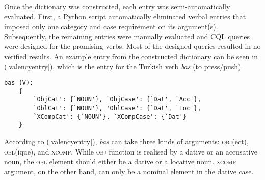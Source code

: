 Once the dictionary was constructed, each entry was semi-automatically evaluated. First, a Python script automatically eliminated verbal entries that imposed only one category and case requirement on its argument(s). Subsequently, the remaining entries were manually evaluated and CQL queries were designed for the promising verbs. Most of the designed queries resulted in no verified results. An example entry from the constructed dictionary can be seen in (\ref{valencyentry}), which is the entry for the Turkish verb \textit{bas} (to press/push). 


\pex \label{valencyentry}
\vspace{-2.1em}
\begin{Verbatim}[xleftmargin=-.2in]
	bas (V):
	{
		`ObjCat': {`NOUN'}, `ObjCase': {`Dat', `Acc'}, 
		`OblCat': {`NOUN'}, 'OblCase': {`Dat', `Loc'}, 
		`XCompCat': {`NOUN'}, `XCompCase': {`Dat'}
	}
\end{Verbatim}
\xe

According to (\ref{valencyentry}), \textit{bas} can take three kinds of arguments: \textsc{obj}(ect), \textsc{obl}(ique), and \textsc{xcomp}. While \textsc{obj} function is realised by a dative or an accusative noun, the \textsc{obl} element should either be a dative or a locative noun. \textsc{xcomp} argument, on the other hand, can only be a nominal element in the dative case. 
